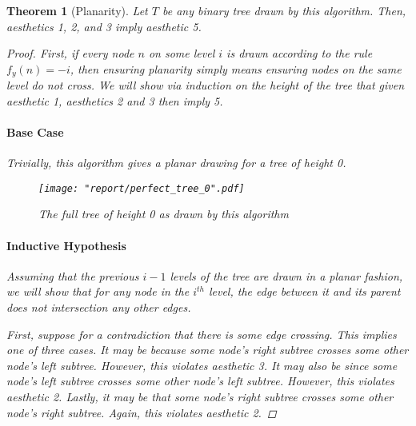 \documentclass[11pt]{report}
\newtheorem{theorem}{Theorem}[section]
\begin{document}
\begin{theorem}[Planarity]
    \label{tree_lp_planar}
    Let $T$ be any binary tree drawn by this algorithm. Then, aesthetics 1, 2, and 3 imply aesthetic 5.
    
    \begin{proof}
        First, if every node $n$ on some level $i$ is drawn according to the rule $f_y(n) = -i$, then ensuring planarity simply means ensuring nodes on the same level do not cross. We will show via induction on the height of the tree that given aesthetic 1, aesthetics 2 and 3 then imply 5.
        
        \bigskip
        
        \paragraph{Base Case} Trivially, this algorithm gives a planar drawing for a tree of height 0.
        
        \begin{figure}[H]
            \centering
            \texttt{[image: "report/perfect\_tree\_0".pdf]}
            \caption{The full tree of height 0 as drawn by this algorithm}
        \end{figure}
        
        \paragraph{Inductive Hypothesis} Assuming that the previous $i - 1$ levels of the tree are drawn in a planar fashion, we will show that for any node in the $i^{th}$ level, the edge between it and its parent does not intersection any other edges.
        
        \bigskip
        
        First, suppose for a contradiction that there is some edge crossing. This implies one of three cases. It may be because some node's right subtree crosses some other node's left subtree. However, this violates aesthetic 3. It may also be since some node's left subtree crosses some other node's left subtree. However, this violates aesthetic 2. Lastly, it may be that some node's right subtree crosses some other node's right subtree. Again, this violates aesthetic 2.
    \end{proof}
\end{theorem}
\end{document}
